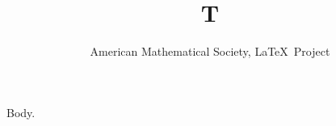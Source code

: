 \documentclass{amsbook}
\begin{document}
\title{T}
\author{American Mathematical Society, \LaTeX\ Project}
\maketitle
Body.
\end{document}
